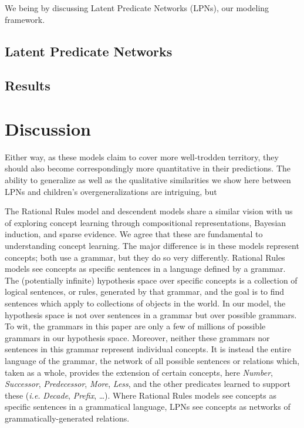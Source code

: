 \documentclass[10pt,letterpaper]{article}
\begin{document}
We being by discussing Latent Predicate Networks
(LPNs), our modeling framework.

\subsection{Latent Predicate Networks}


\subsection{}


\subsection{Results}


\section{Discussion}


Either way, as these models claim to cover more well-trodden
territory, they should also become correspondingly more quantitative
in their predictions. The ability to generalize as well as the
qualitative similarities we show here between LPNs and children's
overgeneralizations are intriguing, but 


The Rational Rules model and descendent models
\citep{goodman2008rational,T.D.Ullman:2012:1b1b6,PianGoodTen2012}
share a similar vision with us of exploring concept learning through
compositional representations, Bayesian induction, and sparse
evidence. We agree that these are fundamental to understanding concept
learning. The major difference is in these models represent concepts;
both use a grammar, but they do so very differently. Rational Rules
models see concepts as specific sentences in a language defined by a
grammar. The (potentially infinite) hypothesis space over specific
concepts is a collection of logical sentences, or rules, generated by
that grammar, and the goal is to find sentences which apply to
collections of objects in the world. In our model, the hypothesis
space is not over sentences in a grammar but over possible grammars.
To wit, the grammars in this paper are only a few of millions of
possible grammars in our hypothesis space. Moreover, neither these
grammars nor sentences in this grammar represent individual concepts.
It is instead the entire language of the grammar, the network of all
possible sentences or relations which, taken as a whole, provides the
extension of certain concepts, here \emph{Number}, \emph{Successor},
\emph{Predecessor}, \emph{More}, \emph{Less}, and the other predicates
learned to support these ({\it i.e.} \emph{Decade}, \emph{Prefix},
\ldots). Where Rational Rules models see concepts as specific
sentences in a grammatical language, LPNs see concepts as networks of
grammatically-generated relations.
\end{document}
